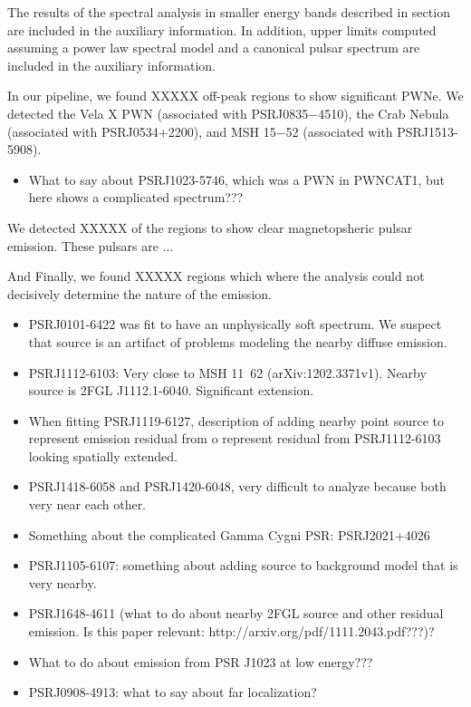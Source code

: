 The results of the spectral analysis in smaller energy bands described
in section  are included in the auxiliary
information. In addition, upper limits computed assuming a power law
spectral model and a canonical pulsar spectrum are included in the
auxiliary information.

In our pipeline, we found XXXXX off-peak regions to show significant PWNe.
We detected the Vela X PWN (associated with PSRJ0835$-$4510), the Crab Nebula (associated
with PSRJ0534+2200), and MSH 15$-$52 (associated with PSRJ1513-5908).
\begin{itemize}
  \item What to say about PSRJ1023-5746, which was a PWN in PWNCAT1, but here shows a complicated spectrum???
\end{itemize}

We detected XXXXX of the regions to show clear magnetopsheric pulsar emission.
These pulsars are ...

And Finally, we found XXXXX regions which where the analysis could not decisively determine the nature of the emission.
\begin{itemize}
  \item PSRJ0101-6422 was fit to have an unphysically soft spectrum. We suspect that source is an artifact of
  problems modeling the nearby diffuse emission.
  \item PSRJ1112-6103: Very close to MSH 11~62 (arXiv:1202.3371v1). Nearby source is 2FGL J1112.1-6040. Significant extension.
  \item When fitting PSRJ1119-6127, description of adding nearby point
  source to represent emission residual from o represent residual from
  PSRJ1112-6103 looking spatially
    extended.
  \item PSRJ1418-6058 and PSRJ1420-6048, very difficult to analyze because both very near each other.
  \item Something about the complicated Gamma Cygni PSR: PSRJ2021+4026
  \item PSRJ1105-6107: something about adding source to background model that is very nearby.
  \item PSRJ1648-4611 (what to do about nearby 2FGL source and other residual emission. Is this paper relevant: http://arxiv.org/pdf/1111.2043.pdf???)?
  \item What to do about emission from PSR J1023 at low energy???
  \item PSRJ0908-4913: what to say about far localization?
\end{itemize}

